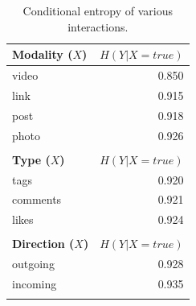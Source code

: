 \begin{table}
\caption{Conditional entropy of various interactions.}
\label{table:ce_interaction}
\vspace{-2mm}
\centering
{\footnotesize
	\begin{tabular}{| >{\small}l | >{\small}r | }
		\hline
		\textbf{ Modality ($X$)} & $H(Y|X=true)$ \\
		\hline
		{ video } & 0.850 \\
		\hline
		{ link } & 0.915 \\
		\hline
		{ post } & 0.918 \\
		\hline
		{ photo } & 0.926 \\
		\hline
\multicolumn{2}{c}{}\\
		\hline
		\textbf{ Type ($X$)}  & $H(Y|X=true)$ \\
		\hline
		{ tags }  &  0.920 \\
		\hline
		{ comments }  &  0.921 \\
		\hline
		{ likes }  &  0.924 \\
		\hline
\multicolumn{2}{c}{}\\
		\hline
		\textbf{ Direction ($X$) } & $H(Y|X=true)$ \\
		\hline
		{ outgoing }  &  0.928 \\
		\hline
		{ incoming }  &  0.935 \\
		\hline
\multicolumn{2}{c}{}\\
%	

\end{tabular}}
\end{table}
